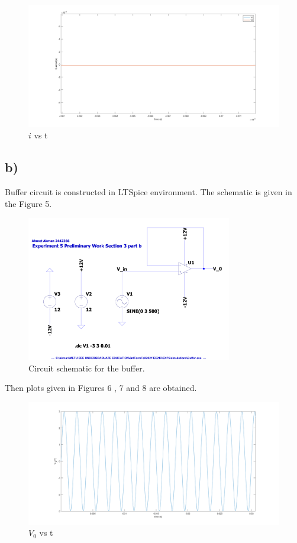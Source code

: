 \documentclass[letterpaper,12pt]{article}
\begin{document}
\begin{figure}[H]
	\centering
   \includegraphics[width=1\textwidth]{3a_i.png}
   \caption{\(i\) vs t}
\end{figure}

\subsection{b)}
Buffer circuit is constructed in LTSpice environment. The schematic is given in the Figure 5.
\begin{figure}[H]
	\centering
   \includegraphics[width=0.8\textwidth]{Buffer_SCH.pdf}
   \caption{Circuit schematic for the buffer.}
\end{figure} 
Then plots given in Figures 6 , 7 and 8 are obtained.
\begin{figure}[H]
	\centering
   \includegraphics[width=1\textwidth]{3b_vs_t.png}
   \caption{\(V_0\) vs t}
\end{figure}
\end{document}
